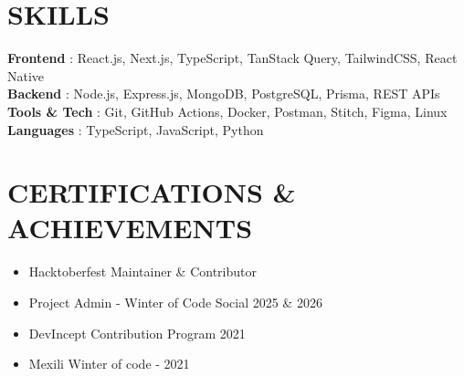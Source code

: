 \documentclass[letterpaper,11pt]{article}
\newcommand{\resumeItem}[1]{
  \item\small{
    {#1 \vspace{-1pt}}
  }
}
\newcommand{\resumeSubHeadingListStart}{\begin{itemize}[leftmargin=0in, label={}]}
\newcommand{\resumeSubHeadingListEnd}{\end{itemize}}
\begin{document}
\section{SKILLS}
 \begin{itemize}[leftmargin=0in, label={}]
    \small{\item{
     \textbf{Frontend}     {: React.js, Next.js, TypeScript, TanStack Query, TailwindCSS, React Native}\vspace{2pt} \\
     \textbf{Backend}     {: Node.js, Express.js, MongoDB, PostgreSQL, Prisma, REST APIs}\vspace{2pt} \\
     \textbf{Tools \& Tech} {: Git, GitHub Actions, Docker, Postman, Stitch, Figma, Linux}\vspace{2pt} \\
     \textbf{Languages}    {: TypeScript, JavaScript, Python}
    }}
 \end{itemize}


\section{CERTIFICATIONS \& ACHIEVEMENTS}
 \resumeSubHeadingListStart
    \resumeItem{Hacktoberfest Maintainer \& Contributor}
    \resumeItem{Project Admin - Winter of Code Social 2025 \& 2026}
    \resumeItem{DevIncept Contribution Program 2021}
    \resumeItem{Mexili Winter of code - 2021}
 \resumeSubHeadingListEnd


\end{document}

